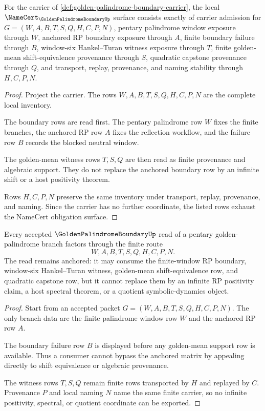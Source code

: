 \begin{theorem}
\label{thm:golden-palindrome-boundary-namecert-obligations}
For the carrier of \autoref{def:golden-palindrome-boundary-carrier}, the local $\NameCert_{\GoldenPalindromeBoundaryUp}$ surface consists exactly of carrier admission for $G=(W,A,B,T,S,Q,H,C,P,N)$, pentary palindrome window exposure through $W$, anchored RP boundary exposure through $A$, finite boundary failure through $B$, window-six Hankel--Turan witness exposure through $T$, finite golden-mean shift-equivalence provenance through $S$, quadratic capstone provenance through $Q$, and transport, replay, provenance, and naming stability through $H,C,P,N$.
\end{theorem}
\begin{proof}
Project the carrier. The rows $W,A,B,T,S,Q,H,C,P,N$ are the complete local inventory.

The boundary rows are read first. The pentary palindrome row $W$ fixes the finite branches, the anchored RP row $A$ fixes the reflection workflow, and the failure row $B$ records the blocked neutral window.

The golden-mean witness rows $T,S,Q$ are then read as finite provenance and algebraic support. They do not replace the anchored boundary row by an infinite shift or a host positivity theorem.

Rows $H,C,P,N$ preserve the same inventory under transport, replay, provenance, and naming. Since the carrier has no further coordinate, the listed rows exhaust the NameCert obligation surface.
\end{proof}

\begin{theorem}
\label{thm:golden-palindrome-boundary-anchored-nonescape}
Every accepted $\GoldenPalindromeBoundaryUp$ read of a pentary golden-palindrome branch factors through the finite route
$$
W,A,B,T,S,Q,H,C,P,N.
$$
The read remains anchored: it may consume the finite-window RP boundary, window-six Hankel--Turan witness, golden-mean shift-equivalence row, and quadratic capstone row, but it cannot replace them by an infinite RP positivity claim, a host spectral theorem, or a quotient symbolic-dynamics object.
\end{theorem}
\begin{proof}
Start from an accepted packet $G=(W,A,B,T,S,Q,H,C,P,N)$. The only branch data are the finite palindrome window row $W$ and the anchored RP row $A$.

The boundary failure row $B$ is displayed before any golden-mean support row is available. Thus a consumer cannot bypass the anchored matrix by appealing directly to shift equivalence or algebraic provenance.

The witness rows $T,S,Q$ remain finite rows transported by $H$ and replayed by $C$. Provenance $P$ and local naming $N$ name the same finite carrier, so no infinite positivity, spectral, or quotient coordinate can be exported.
\end{proof}

